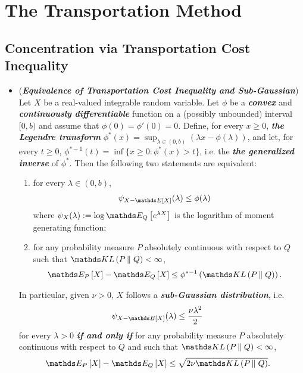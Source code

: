 \documentclass[11pt]{article}
\begin{document}
\section{The Transportation Method}
\subsection{Concentration via Transportation Cost Inequality}
\begin{itemize}
\item \begin{remark} (\textbf{\emph{Equivalence of Transportation Cost Inequality and Sub-Gaussian}}) \citep{boucheron2013concentration} \\
Let $X$ be a real-valued integrable random variable. Let $\phi$ be a \textbf{\emph{convex}} and \textbf{\emph{continuously differentiable}} function on a (possibly unbounded) interval $[0, b)$ and assume that $\phi(0) = \phi'(0) = 0$. Define, for every $x \ge 0$, \textbf{\emph{the Legendre transform}} $\phi^{*}(x) = \sup_{\lambda \in (0,b)}(\lambda x - \phi(\lambda))$, and let, for every $t \ge 0$, $\phi^{*-1}(t) = \inf\{x \ge 0: \phi^{*}(x) > t\}$, i.e. the \textbf{\emph{the generalized inverse}} of $\phi^{*}$. Then the following two statements are equivalent:
\begin{enumerate}
\item for every $\lambda \in (0,b)$,
\begin{align*}
\psi_{X - \E{}{X}}(\lambda) &\le \phi(\lambda)
\end{align*} where $\psi_{X}(\lambda):= \log\E{Q}{e^{\lambda X}}$ is the logarithm of moment generating function;
\item for any probability measure $P$ absolutely continuous with respect to $Q$ such that $\kl{P}{Q} < \infty$,
\begin{align}
\E{P}{X} - \E{Q}{X} &\le \phi^{*-1}\paren{\kl{P}{Q}}. \label{ineqn: information_inequality_general}
\end{align} 
\end{enumerate}
In particular, given $\nu > 0$, $X$ follows a \emph{\textbf{sub-Gaussian distribution}}, i.e.
\begin{align*}
\psi_{X - \E{}{X}}(\lambda) &\le \frac{\nu\lambda^2}{2}
\end{align*} for every $\lambda >0$ \textbf{\emph{if and only if}} for any probability measure $P$ absolutely continuous with respect to $Q$ and such that $\kl{P}{Q} < \infty$, 
\begin{align}
\E{P}{X} - \E{Q}{X} &\le \sqrt{2\nu\kl{P}{Q}}. \label{ineqn: information_inequality_sub_gaussian}
\end{align}
\end{remark}


\end{itemize}
\end{document}
